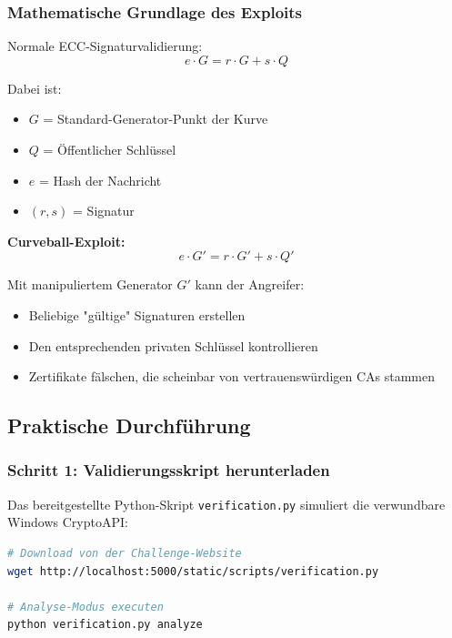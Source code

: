 \documentclass{article}
\begin{document}
\subsubsection{Mathematische Grundlage des Exploits}

Normale ECC-Signaturvalidierung:
\begin{equation}
e \cdot G = r \cdot G + s \cdot Q
\end{equation}

Dabei ist:
\begin{itemize}
    \item $G$ = Standard-Generator-Punkt der Kurve
    \item $Q$ = Öffentlicher Schlüssel
    \item $e$ = Hash der Nachricht
    \item $(r,s)$ = Signatur
\end{itemize}

\textbf{Curveball-Exploit:}
\begin{equation}
e \cdot G' = r \cdot G' + s \cdot Q'
\end{equation}

Mit manipuliertem Generator $G'$ kann der Angreifer:
\begin{itemize}
    \item Beliebige "gültige" Signaturen erstellen
    \item Den entsprechenden privaten Schlüssel kontrollieren
    \item Zertifikate fälschen, die scheinbar von vertrauenswürdigen CAs stammen
\end{itemize}

\subsection{Praktische Durchführung}

\subsubsection{Schritt 1: Validierungsskript herunterladen}

Das bereitgestellte Python-Skript \texttt{verification.py} simuliert die verwundbare Windows CryptoAPI:

\begin{lstlisting}[language=bash, caption=Skript-Download]
# Download von der Challenge-Website
wget http://localhost:5000/static/scripts/verification.py

# Analyse-Modus executen
python verification.py analyze
\end{lstlisting}
\end{document}
